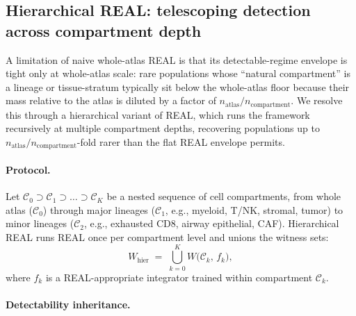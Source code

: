 
\subsection*{Hierarchical REAL: telescoping detection across compartment depth}
\label{sec:methods-hierarchical-real}

A limitation of naive whole-atlas REAL is that its detectable-regime envelope is tight only at whole-atlas scale: rare populations whose ``natural compartment'' is a lineage or tissue-stratum typically sit below the whole-atlas floor because their mass relative to the atlas is diluted by a factor of $n_{\text{atlas}}/n_{\text{compartment}}$. We resolve this through a hierarchical variant of REAL, which runs the framework recursively at multiple compartment depths, recovering populations up to $n_{\text{atlas}}/n_{\text{compartment}}$-fold rarer than the flat REAL envelope permits.

\paragraph{Protocol.}
Let $\mathcal{C}_{0} \supset \mathcal{C}_{1} \supset \dots \supset \mathcal{C}_{K}$ be a nested sequence of cell compartments, from whole atlas ($\mathcal{C}_{0}$) through major lineages ($\mathcal{C}_{1}$, e.g., myeloid, T/NK, stromal, tumor) to minor lineages ($\mathcal{C}_{2}$, e.g., exhausted CD8, airway epithelial, CAF). Hierarchical REAL runs REAL once per compartment level and unions the witness sets:
\[
  W_{\text{hier}} \;=\; \bigcup_{k=0}^{K} W\bigl(\mathcal{C}_{k},\, f_{k}\bigr),
\]
where $f_{k}$ is a REAL-appropriate integrator trained within compartment $\mathcal{C}_{k}$.

\paragraph{Detectability inheritance.}

